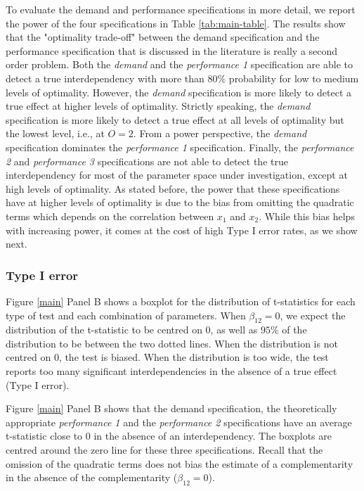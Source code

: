 \documentclass[12pt]{article}
\begin{document}


To evaluate the demand and performance specifications in more detail, we report the power of the four specifications in Table \ref{tab:main-table}. The results show that the "optimality trade-off" between the demand specification and the performance specification that is discussed in the literature \citep{grabner_management_2013, aral_three-way_2012, johansson_testing_2018} is really a second order problem. Both the \emph{demand} and the \emph{performance 1} specification are able to detect a true interdependency with more than $80\%$ probability for low to medium levels of optimality. However, the \emph{demand} specification is more likely to detect a true effect at higher levels of optimality. Strictly speaking, the \emph{demand} specification is more likely to detect a true effect at all levels of optimality but the lowest level, i.e., at \(O = 2\). From a power perspective, the \emph{demand} specification dominates the \emph{performance 1} specification. Finally, the \emph{performance 2} and \emph{performance 3} specifications are not able to detect the true interdependency for most of the parameter space under investigation, except at high levels of optimality. As stated before, the power that these specifications have at higher levels of optimality is due to the bias from omitting the quadratic terms which depends on the correlation between $x_1$ and $x_2$. While this bias helps with increasing power, it comes at the cost of high Type I error rates, as we show next.

\subsubsection{Type I error}\label{Type I error}
Figure \ref{main} Panel B shows a boxplot for the distribution of t-statistics for each type of test and each combination of parameters. When $\beta_{12} = 0$, we expect the distribution of the t-statistic to be centred on $0$, as well as $95\%$ of the distribution to be between the two dotted lines. When the distribution is not centred on $0$, the test is biased. When the distribution is too wide, the test reports too many significant interdependencies in the absence of a true effect (Type I error).

Figure \ref{main} Panel B shows that the demand specification, the theoretically appropriate \emph{performance 1} and the \emph{performance 2} specifications have an average t-statistic close to $0$ in the absence of an interdependency. The boxplots are centred around the zero line for these three specifications. Recall that the omission of the quadratic terms does not bias the estimate of a complementarity in the absence of the complementarity ($\beta_{12} = 0$).
\end{document}
